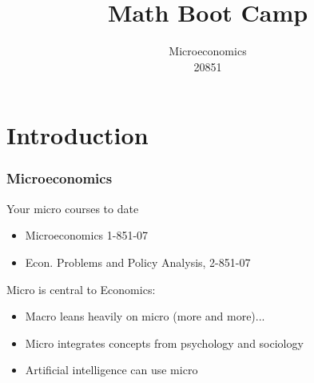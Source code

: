 \documentclass[handout]{beamer}
\title{Math Boot Camp}
\author{Microeconomics \\ 20851}
\date{}
\begin{document}
\frame{\titlepage}

\section[Outline]{}
\frame{\tableofcontents}

\section{Introduction}
\frame
{
  \frametitle{Microeconomics}
Your micro courses to date
  \begin{itemize}
  \item<1-> Microeconomics 1-851-07
  \item<2-> Econ. Problems and Policy Analysis, 2-851-07
  \end{itemize}
  \vspace{0.2in}
  Micro is central to Economics: 
  \begin{itemize}
    \item<3-> Macro leans heavily on micro (more and more)...
    \item<4-> Micro integrates concepts from psychology and sociology
    \item<5-> Artificial intelligence can use micro
  \end{itemize}
}
\end{document}
